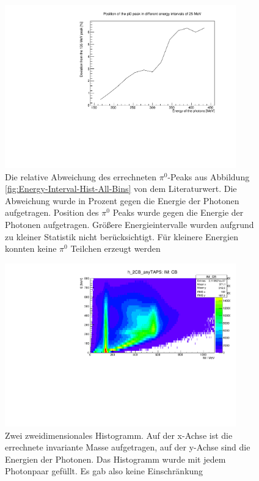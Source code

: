 \documentclass[a4paper,11pt,oneside,final,german,openbib,pdftex]{scrbook}
\begin{document}
{\begin{appendix}
\begin{figure}[h]
	\begin{center}
		\includegraphics[width=100mm]{relativedependency0903}
		
		\caption{Die relative Abweichung des errechneten $\pi^0$-Peaks aus Abbildung \ref{fig:Energy-Interval-Hist-All-Bins} von dem Literaturwert. Die Abweichung wurde in Prozent gegen die Energie der Photonen aufgetragen.  Position des $\pi^0$ Peaks wurde gegen die Energie der Photonen aufgetragen. Gr\"o{\ss}ere Energieintervalle wurden aufgrund zu kleiner Statistik nicht ber\"ucksichtigt. F\"ur kleinere Energien konnten keine $\pi^0$ Teilchen erzeugt werden}			
		\label{fig:RelativEnergyDependency}	

	\end{center}
\end{figure}

\begin{figure}[h]
	\begin{center}
		\includegraphics[width=100mm]{allphotons2Dhist1303}
		\caption{Zwei zweidimensionales Histogramm. Auf der x-Achse ist die errechnete invariante Masse aufgetragen, auf der y-Achse sind die Energien der Photonen. Das Histogramm wurde mit jedem Photonpaar gefüllt. Es gab also keine Einschränkung }
		\label{fig:Energy-Intervall-Hist-All-Energys-No-Condition}
	\end{center}
\end{figure}



\end{appendix}}
\end{document}
